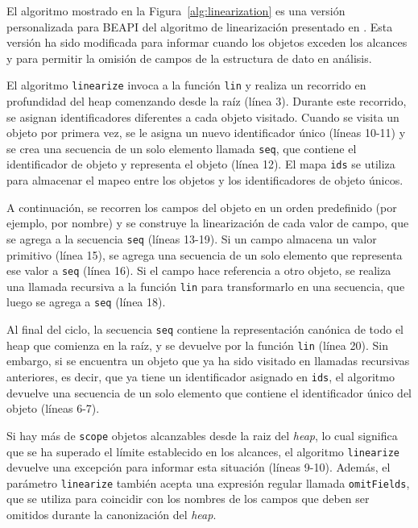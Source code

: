 El algoritmo mostrado en la Figura~\ref{alg:linearization} es una versión personalizada para \textsf{BEAPI} del algoritmo de linearización presentado en \cite{Xie04}. Esta versión ha sido modificada para informar cuando los objetos exceden los alcances y para permitir la omisión de campos de la estructura de dato en análisis.

El algoritmo \texttt{linearize} invoca a la función \texttt{lin} y realiza un recorrido en profundidad del heap comenzando desde la raíz (línea 3). Durante este recorrido, se asignan identificadores diferentes a cada objeto visitado. Cuando se visita un objeto por primera vez, se le asigna un nuevo identificador único (líneas 10-11) y se crea una secuencia de un solo elemento llamada \texttt{seq}, que contiene el identificador de objeto y representa el objeto (línea 12). El mapa \texttt{ids} se utiliza para almacenar el mapeo entre los objetos y los identificadores de objeto únicos.

A continuación, se recorren los campos del objeto en un orden predefinido (por ejemplo, por nombre) y se construye la linearización de cada valor de campo, que se agrega a la secuencia \texttt{seq} (líneas 13-19). Si un campo almacena un valor primitivo (línea 15), se agrega una secuencia de un solo elemento que representa ese valor a \texttt{seq} (línea 16). Si el campo hace referencia a otro objeto, se realiza una llamada recursiva a la función \texttt{lin} para transformarlo en una secuencia, que luego se agrega a \texttt{seq} (línea 18).

Al final del ciclo, la secuencia \texttt{seq} contiene la representación canónica de todo el heap que comienza en la raíz, y se devuelve por la función \texttt{lin} (línea 20). Sin embargo, si se encuentra un objeto que ya ha sido visitado en llamadas recursivas anteriores, es decir, que ya tiene un identificador asignado en \texttt{ids}, el algoritmo devuelve una secuencia de un solo elemento que contiene el identificador único del objeto (líneas 6-7).

Si hay más de \texttt{scope} objetos alcanzables desde la raiz del \emph{heap}, lo cual significa que se ha superado el límite establecido en los alcances, el algoritmo \texttt{linearize} devuelve una excepción para informar esta situación (líneas 9-10). Además, el parámetro \texttt{linearize} también acepta una expresión regular llamada \texttt{omitFields}, que se utiliza para coincidir con los nombres de los campos que deben ser omitidos durante la canonización del \emph{heap}.

